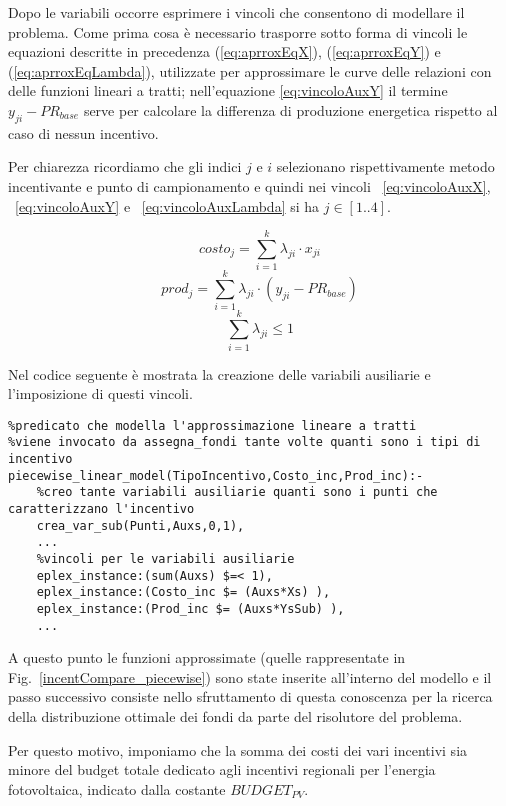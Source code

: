 Dopo le variabili occorre esprimere i vincoli che consentono di modellare il problema. Come prima cosa è necessario trasporre sotto forma di vincoli le equazioni descritte in precedenza (\ref{eq:aprroxEqX}), (\ref{eq:aprroxEqY}) e (\ref{eq:aprroxEqLambda}), utilizzate per approssimare le curve delle relazioni con delle funzioni lineari a tratti; nell'equazione \ref{eq:vincoloAuxY} il termine $y_{ji}-PR_{base}$ serve per calcolare la differenza di produzione energetica rispetto al caso di nessun incentivo.

Per chiarezza ricordiamo che gli indici $j$ e $i$ selezionano rispettivamente metodo incentivante e punto di campionamento e quindi nei vincoli ~\ref{eq:vincoloAuxX}, ~\ref{eq:vincoloAuxY} e ~\ref{eq:vincoloAuxLambda} si ha $j \in [1..4]$.

\begin{equation} \label{eq:vincoloAuxX}
	costo_j = \sum_{i=1}^k \lambda_{ji} \cdot x_{ji} 
\end{equation}
\begin{equation} \label{eq:vincoloAuxY}
	prod_j = \sum_{i=1}^k \lambda_{ji} \cdot (y_{ji}-PR_{base}) 
\end{equation}
\begin{equation} \label{eq:vincoloAuxLambda}
	\sum_{i=1}^k \lambda_{ji} \leq 1
\end{equation}

Nel codice seguente è mostrata la creazione delle variabili ausiliarie e l'imposizione di questi vincoli.
\begin{lstlisting}
%predicato che modella l'approssimazione lineare a tratti
%viene invocato da assegna_fondi tante volte quanti sono i tipi di incentivo
piecewise_linear_model(TipoIncentivo,Costo_inc,Prod_inc):-
	%creo tante variabili ausiliarie quanti sono i punti che caratterizzano l'incentivo
	crea_var_sub(Punti,Auxs,0,1),
	...
	%vincoli per le variabili ausiliarie
	eplex_instance:(sum(Auxs) $=< 1),
	eplex_instance:(Costo_inc $= (Auxs*Xs) ),
	eplex_instance:(Prod_inc $= (Auxs*YsSub) ),
	...
\end{lstlisting}

A questo punto le funzioni approssimate (quelle rappresentate in Fig.~\ref{incentCompare_piecewise}) sono state inserite all'interno del modello e il passo successivo consiste nello sfruttamento di questa conoscenza per la ricerca della distribuzione ottimale dei fondi da parte del risolutore del problema.

Per questo motivo, imponiamo che la somma dei costi dei vari incentivi sia minore del budget totale dedicato agli incentivi regionali per l'energia fotovoltaica, indicato dalla costante $BUDGET_{PV}$.

